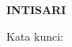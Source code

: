 \clearpage
{}
{}
\begin{center}
    \textbf{INTISARI}\\[0.5cm]
\end{center}

\lipsum[2-4]

\noindent Kata kunci: \katakunci